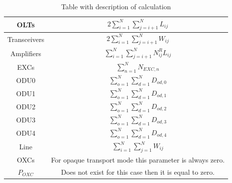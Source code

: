 \begin{table}[H]
\centering
\begin{tabular}{|| c | c ||}
 \hline
 OLTs & \(\displaystyle 2 \sum_{i=1}^{N}\sum_{j=i+1}^{N} L_{ij} \) \\ \hline
 Transceivers & \(\displaystyle 2 \sum_{i=1}^{N}\sum_{j=i+1}^{N} W_{ij} \) \\ \hline
 Amplifiers & \(\displaystyle \sum_{i=1}^{N}\sum_{j=i+1}^{N} N^R_{ij} L_{ij} \) \\ \hline
 EXCs & \(\displaystyle \sum_{n=1}^N N_{EXC,n} \) \\ \hline
 ODU0 & \(\displaystyle \sum_{o=1}^{N}\sum_{d=1}^{N} D_{od,0} \) \\ \hline
 ODU1 & \(\displaystyle \sum_{o=1}^{N}\sum_{d=1}^{N} D_{od,1} \) \\ \hline
 ODU2 & \(\displaystyle \sum_{o=1}^{N}\sum_{d=1}^{N} D_{od,2} \)\\ \hline
 ODU3 & \(\displaystyle \sum_{o=1}^{N}\sum_{d=1}^{N} D_{od,3} \) \\ \hline
 ODU4 & \(\displaystyle \sum_{o=1}^{N}\sum_{d=1}^{N} D_{od,4} \) \\ \hline
 Line & \(\displaystyle \sum_{i=1}^{N}\sum_{j=1}^{N} W_{ij} \) \\ \hline
 OXCs & For opaque transport mode this parameter is always zero. \\ \hline
 $P_{OXC}$ & Does not exist for this case then it is equal to zero. \\
 \hline
 \end{tabular}
\caption{Table with description of calculation}
\label{formulas_opaque_surv_ref_high_heuristic}
\end{table} 
